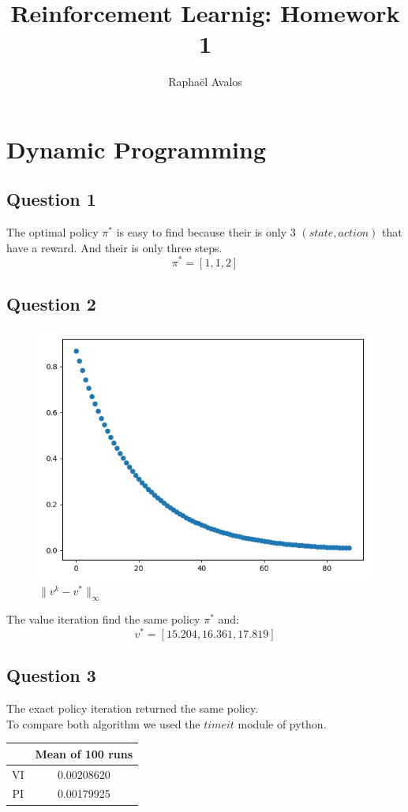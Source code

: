 \documentclass[10pt,a4paper]{article}
\author{Raphaël Avalos}
\title{Reinforcement Learnig: Homework 1}
\begin{document}
\maketitle
\section{Dynamic Programming}
\subsection{Question 1}
The optimal policy $\pi^*$ is easy to find because their is only 3 $(state,action)$ that have a reward. And their is only three steps.
$$ \pi^* = [1, 1, 2] $$
\subsection{Question 2}
\begin{figure}[h]
\centering
\caption{$\parallel v^k - v^* \parallel_{\infty}$}
\includegraphics[scale=.35]{q1.png}
\end{figure}
The value iteration find the same policy $\pi^*$ and:
$$ v^* = [15.204, 16.361, 17.819] $$
\subsection{Question 3}
The exact policy iteration returned the same policy.\\
To compare both algorithm we used the $timeit$ module of python.\\
\begin{tabular}{|c|c|}
\hline 
 & Mean of 100 runs \\ 
\hline 
VI & 0.00208620 \\ 
\hline 
PI & 0.00179925 \\ 
\hline 
\end{tabular} 
\newpage
\end{document}
